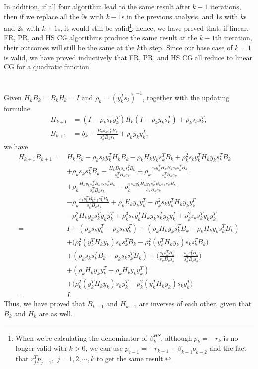 \documentclass[11pt]{article}
\begin{document}
In addition, if all four algorithm lead to the same result after $k-1$ iterations, then if we replace all the 0s with $k-1$s in the previous analysis, and 1s with $k$s and 2s with $k+1$s, it would still be valid\footnote{When we're calculating the denominator of $\beta^{HS}_k$, although $p_k=-r_k$ is no longer valid with $k>0$, we can use $p_{k-1} = -r_{k-1} + \beta_{k-1}p_{k-2}$ and the fact that $r_{j}^Tp_{j-1},\,\,j = 1, 2, \cdots, k$ to get the same result.}; hence, we have proved that, if linear, FR, PR, and HS CG algorithms produce the same result at the ${k-1}$th iteration, their outcomes will still be the same at the $k$th step. Since our base case of $k=1$ is valid, we have proved inductively that FR, PR, and HS CG all reduce to linear CG for a quadratic function. 

\section{}
Given $H_kB_k = B_kH_k=I$ and $\rho_k = (y_k^Ts_k)^{-1}$, together with the updating formulae
\begin{equation}\begin{split} 
H_{k+1} &= (I-\rho_k s_k y_k^T )H_k(I-\rho_ky_ks_k^T) + \rho_ks_ks_k^T,\\
B_{k+1} &=b_k - \frac{B_ks_ks_k^TB_k}{s_k^TB_ks_k} + \rho_ky_ky_k^T,
\end{split}\nonumber\end{equation} 
we have 
\begin{equation}\begin{split} 
H_{k+1}B_{k+1} =& H_kB_k -\rho_ks_ky_k^TH_kB_k - \rho_kH_ky_ks_k^TB_k + \rho_k^2s_ky_k^TH_ky_ks_k^TB_k \\
& +\rho_ks_ks_k^TB_k-\frac{H_kB_ks_ks_k^TB_k}{s_k^TB_ks_k} + \rho_k\frac{s_ky_k^TH_kB_ks_ks_k^TB_k}{s_k^TB_ks_k}\\
&+\rho_k\frac{H_ky_ks_k^TB_ks_ks_k^TB_k}{s_k^TB_ks_k} -\rho_k^2\frac{s_ky_k^TH_ky_ks_k^TB_ks_ks_k^TB_k}{s_kB_ks_k}\\
&-\rho_k\frac{s_ks_k^TB_ks_ks_k^TB_k}{s_k^TB_ks_k}+\rho_kH_ky_ky_k^T-\rho_k^2s_ky_k^TH_ky_ky_k^T \\
&- \rho_k^2H_ky_ks_k^Ty_ky_k^T + \rho_k^3s_ky_k^TH_ky_ks_k^Ty_ky_k^T + \rho_k^2s_ks_k^Ty_ky_k^T \\
=&I + (\rho_ks_ky_k^T - \rho_ks_ky_k^T) + (\rho_kH_ky_ks_k^TB_k-\rho_kH_ky_ks_k^TB_k) \\
& + \Big(\rho_k^2(y_k^TH_ky_k)s_ks_k^TB_k - \rho_k^2(y_k^TH_ky_k)s_ks_k^TB_k \Big) \\
& +(\rho_ks_ks_k^TB_k - \rho_ks_ks_k^TB_k) + \Big(\frac{s_ks_k^TB_k}{s_k^TB_ks_k}-\frac{s_ks_k^TB_k}{s_k^TB_ks_k} \Big) \\
& + (\rho_kH_ky_ky_k^T - \rho_kH_ky_ky_k^T) \\
& + \Big( \rho_k^2(y_k^TH_ky_k)s_ky_k^T - \rho_k^2(y_k^TH_ky_k)s_ky_k^T \Big) \\
=&I.
\end{split}\nonumber\end{equation} 
Thus, we have proved that $B_{k+1}$ and $H_{k+1}$ are inverses of each other, given that $B_k$ and $H_k$ are as well.
\end{document}

